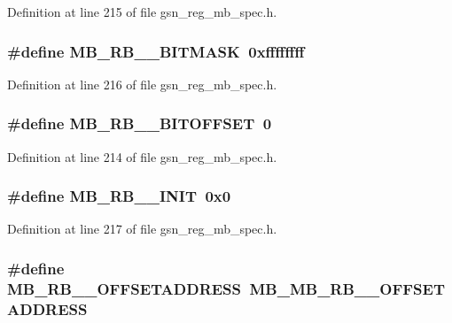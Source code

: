 Definition at line 215 of file gsn\_\-reg\_\-mb\_\-spec.h.

\hypertarget{a00562_a44f62ac8267c1a5ab13b97986a797dc3}{
\subsubsection[{MB\_\-RB\_\-0\_\-BITMASK}]{\setlength{\rightskip}{0pt plus 5cm}\#define MB\_\-RB\_\_\-BITMASK~0xffffffff}}
\label{a00562_a44f62ac8267c1a5ab13b97986a797dc3}


Definition at line 216 of file gsn\_\-reg\_\-mb\_\-spec.h.

\hypertarget{a00562_ad75f113ddc424394f314308f55c3155c}{
\subsubsection[{MB\_\-RB\_\-0\_\-BITOFFSET}]{\setlength{\rightskip}{0pt plus 5cm}\#define MB\_\-RB\_\_\-BITOFFSET~0}}
\label{a00562_ad75f113ddc424394f314308f55c3155c}


Definition at line 214 of file gsn\_\-reg\_\-mb\_\-spec.h.

\hypertarget{a00562_a6e21363b1f2c1b62d022eb1d94bce0aa}{
\subsubsection[{MB\_\-RB\_\-0\_\-INIT}]{\setlength{\rightskip}{0pt plus 5cm}\#define MB\_\-RB\_\_\-INIT~0x0}}
\label{a00562_a6e21363b1f2c1b62d022eb1d94bce0aa}


Definition at line 217 of file gsn\_\-reg\_\-mb\_\-spec.h.

\hypertarget{a00562_a396b6195feb415bfded154c270303360}{
\subsubsection[{MB\_\-RB\_\-0\_\-OFFSETADDRESS}]{\setlength{\rightskip}{0pt plus 5cm}\#define MB\_\-RB\_\_\-OFFSETADDRESS~MB\_\-MB\_\-RB\_\_\-OFFSETADDRESS}}
\label{a00562_a396b6195feb415bfded154c270303360}



